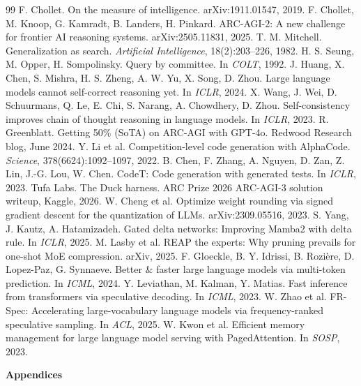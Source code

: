 \documentclass[11pt]{article}
\begin{document}
\small
\begin{thebibliography}{99}\setlength{\itemsep}{1pt}
 F. Chollet. On the measure of intelligence. arXiv:1911.01547, 2019.
 F. Chollet, M. Knoop, G. Kamradt, B. Landers, H. Pinkard. ARC-AGI-2: A new challenge for frontier AI reasoning systems. arXiv:2505.11831, 2025.
 T. M. Mitchell. Generalization as search. \emph{Artificial Intelligence}, 18(2):203--226, 1982.
 H. S. Seung, M. Opper, H. Sompolinsky. Query by committee. In \emph{COLT}, 1992.
 J. Huang, X. Chen, S. Mishra, H. S. Zheng, A. W. Yu, X. Song, D. Zhou. Large language models cannot self-correct reasoning yet. In \emph{ICLR}, 2024.
 X. Wang, J. Wei, D. Schuurmans, Q. Le, E. Chi, S. Narang, A. Chowdhery, D. Zhou. Self-consistency improves chain of thought reasoning in language models. In \emph{ICLR}, 2023.
 R. Greenblatt. Getting 50\% (SoTA) on ARC-AGI with GPT-4o. Redwood Research blog, June 2024.
 Y. Li et al. Competition-level code generation with AlphaCode. \emph{Science}, 378(6624):1092--1097, 2022.
 B. Chen, F. Zhang, A. Nguyen, D. Zan, Z. Lin, J.-G. Lou, W. Chen. CodeT: Code generation with generated tests. In \emph{ICLR}, 2023.
 Tufa Labs. The Duck harness. ARC Prize 2026 ARC-AGI-3 solution writeup, Kaggle, 2026.
 W. Cheng et al. Optimize weight rounding via signed gradient descent for the quantization of LLMs. arXiv:2309.05516, 2023.
 S. Yang, J. Kautz, A. Hatamizadeh. Gated delta networks: Improving Mamba2 with delta rule. In \emph{ICLR}, 2025.
 M. Lasby et al. REAP the experts: Why pruning prevails for one-shot MoE compression. arXiv, 2025.
 F. Gloeckle, B. Y. Idrissi, B. Rozière, D. Lopez-Paz, G. Synnaeve. Better \& faster large language models via multi-token prediction. In \emph{ICML}, 2024.
 Y. Leviathan, M. Kalman, Y. Matias. Fast inference from transformers via speculative decoding. In \emph{ICML}, 2023.
 W. Zhao et al. FR-Spec: Accelerating large-vocabulary language models via frequency-ranked speculative sampling. In \emph{ACL}, 2025.
 W. Kwon et al. Efficient memory management for large language model serving with PagedAttention. In \emph{SOSP}, 2023.
\end{thebibliography}

\normalsize
\clearpage
\appendix
\renewcommand{\thesection}{\Alph{section}}
\begin{center}{\sffamily\bfseries\Large Appendices}\end{center}








\end{document}

